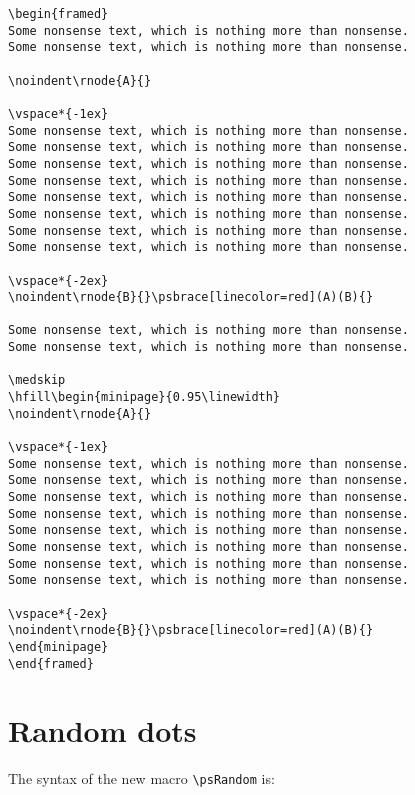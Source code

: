 \begin{lstlisting}
\begin{framed}
Some nonsense text, which is nothing more than nonsense.
Some nonsense text, which is nothing more than nonsense.

\noindent\rnode{A}{}

\vspace*{-1ex}
Some nonsense text, which is nothing more than nonsense.
Some nonsense text, which is nothing more than nonsense.
Some nonsense text, which is nothing more than nonsense.
Some nonsense text, which is nothing more than nonsense.
Some nonsense text, which is nothing more than nonsense.
Some nonsense text, which is nothing more than nonsense.
Some nonsense text, which is nothing more than nonsense.
Some nonsense text, which is nothing more than nonsense.

\vspace*{-2ex}
\noindent\rnode{B}{}\psbrace[linecolor=red](A)(B){}

Some nonsense text, which is nothing more than nonsense.
Some nonsense text, which is nothing more than nonsense.

\medskip
\hfill\begin{minipage}{0.95\linewidth}
\noindent\rnode{A}{}

\vspace*{-1ex}
Some nonsense text, which is nothing more than nonsense.
Some nonsense text, which is nothing more than nonsense.
Some nonsense text, which is nothing more than nonsense.
Some nonsense text, which is nothing more than nonsense.
Some nonsense text, which is nothing more than nonsense.
Some nonsense text, which is nothing more than nonsense.
Some nonsense text, which is nothing more than nonsense.
Some nonsense text, which is nothing more than nonsense.

\vspace*{-2ex}
\noindent\rnode{B}{}\psbrace[linecolor=red](A)(B){}
\end{minipage}
\end{framed}
\end{lstlisting}


\section{Random dots}
The syntax of the new macro \verb+\psRandom+ is:

